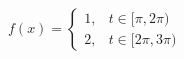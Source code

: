 \documentclass[preview]{standalone}
\begin{document}
\begin{align*}
f\left( x\right) =\begin{cases}1, & t \in [\pi, 2 \pi) \\ 2, & t \in [2 \pi ,3 \pi) \end{cases}
\end{align*}
\end{document}
